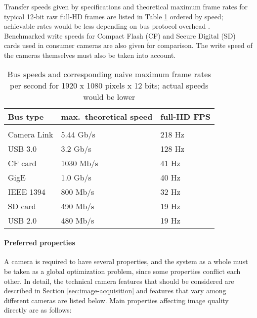 Transfer speeds given by specifications and theoretical maximum frame rates for typical 12-bit raw full-HD frames are listed in Table \ref{tab:busspeeds} ordered by speed; achievable rates would be less depending on bus protocol overhead \cite{hornberg2007handbook,ni2013choosing}.
Benchmarked \cite{tomshw-sdwrite,tomshw-cfwrite} write speeds for Compact Flash (CF) and Secure Digital (SD) cards used in consumer cameras are also given for comparison.
The write speed of the cameras themselves must also be taken into account.

\begin{table}[t]
	\centering
	\begin{tabular}{l l l}
		Bus type & max.~theoretical speed & full-HD FPS\\
		\hline \\
		Camera Link \cite{ni2013choosing} & 5.44 Gb/s & 218 Hz\\
		USB 3.0 \cite{ni2013choosing} & 3.2 Gb/s & 128 Hz\\
		CF card \cite{tomshw-cfwrite} & 1030 Mb/s & 41 Hz\\
		GigE \cite{ni2013choosing} & 1.0 Gb/s & 40 Hz\\
		IEEE 1394 \cite{ni2013choosing} & 800 Mb/s & 32 Hz\\
		SD card \cite{tomshw-sdwrite} & 490 Mb/s & 19 Hz\\
		USB 2.0 \cite{ni2013choosing} & 480 Mb/s & 19 Hz\\
	\end{tabular}
	\caption{Bus speeds and corresponding naive maximum frame rates per second for 1920 x 1080 pixels x 12 bits; actual speeds would be lower}
	\label{tab:busspeeds}
\end{table}

\paragraph{Preferred properties}
A camera is required to have several properties, and the system as a whole must be taken as a global optimization problem, since some properties conflict each other.
In detail, the technical camera features that should be considered are described in Section \ref{sec:image-acquisition} and features that vary among different cameras are listed below.
Main properties affecting image quality directly are as follows:

